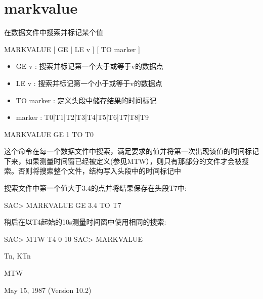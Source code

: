 \section{markvalue}
\label{cmd:markvalue}

在数据文件中搜索并标记某个值

MARKVALUE [ GE | LE v ] [ TO marker ]

\begin{itemize}
\item GE v : 搜索并标记第一个大于或等于v的数据点 
\item LE v : 搜索并标记第一个小于或等于v的数据点 
\item TO marker : 定义头段中储存结果的时间标记 
\item marker : T0|T1|T2|T3|T4|T5|T6|T7|T8|T9 
\end{itemize}

MARKVALUE GE 1 TO T0

这个命令在每一个数据文件中搜索，满足要求的值并将第一次出现该值的时间标记下来，如果测量时间窗已经被定义(参见MTW），则只有那部分的文件才会被搜索。否则将搜索整个文件，结构写入头段中的时间标记中

搜索文件中第一个值大于3.4的点并将结果保存在头段T7中:
\begin{SACCode}
SAC> MARKVALUE GE 3.4 TO T7
\end{SACCode}

稍后在以T4起始的10s测量时间窗中使用相同的搜索:
\begin{SACCode}
SAC> MTW T4 0 10
SAC> MARKVALUE
\end{SACCode}

Tn, KTn

MTW

May 15, 1987 (Version 10.2)
